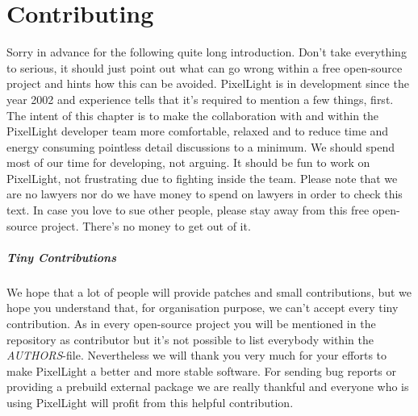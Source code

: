 \chapter{Contributing}
Sorry in advance for the following quite long introduction. Don't take everything to serious, it should just point out what can go wrong within a free open-source project and hints how this can be avoided. PixelLight is in development since the year 2002 and experience tells that it's required to mention a few things, first. The intent of this chapter is to make the collaboration with and within the PixelLight developer team more comfortable, relaxed and to reduce time and energy consuming pointless detail discussions to a minimum. We should spend most of our time for developing, not arguing. It should be fun to work on PixelLight, not frustrating due to fighting inside the team. Please note that we are no lawyers nor do we have money to spend on lawyers in order to check this text. In case you love to sue other people, please stay away from this free open-source project. There's no money to get out of it.


\paragraph{Tiny Contributions}
We hope that a lot of people will provide patches and small contributions, but we hope you understand that, for organisation purpose, we can't accept every tiny contribution. As in every open-source project you will be mentioned in the repository as contributor but it's not possible to list everybody within the \emph{AUTHORS}-file. Nevertheless we will thank you very much for your efforts to make PixelLight a better and more stable software. For sending bug reports or providing a prebuild external package we are really thankful and everyone who is using PixelLight will profit from this helpful contribution.


